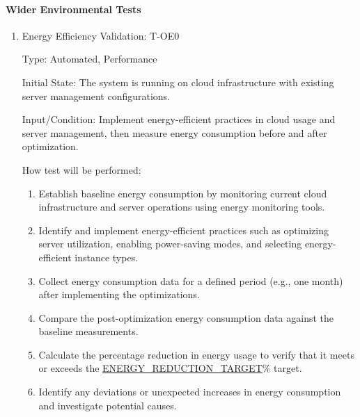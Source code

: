 \documentclass[12pt, titlepage]{article}
\begin{document}
\paragraph{Wider Environmental Tests}
\begin{enumerate}

\item{Energy Efficiency Validation: T-OE0\\}

Type: Automated, Performance

Initial State: The system is running on cloud infrastructure with existing server management configurations.

Input/Condition: Implement energy-efficient practices in cloud usage and server management, then measure energy consumption before and after optimization.

How test will be performed:
\begin{enumerate}
    \item Establish baseline energy consumption by monitoring current cloud infrastructure and server operations using energy monitoring tools.
    \item Identify and implement energy-efficient practices such as optimizing server utilization, enabling power-saving modes, and selecting energy-efficient instance types.
    \item Collect energy consumption data for a defined period (e.g., one month) after implementing the optimizations.
    \item Compare the post-optimization energy consumption data against the baseline measurements.
    \item Calculate the percentage reduction in energy usage to verify that it meets or exceeds the \hyperref[ENERGY_REDUCTION_TARGET]{ENERGY\_REDUCTION\_TARGET}\% target.
    \item Identify any deviations or unexpected increases in energy consumption and investigate potential causes.
\end{enumerate}

\end{enumerate}

\end{document}
